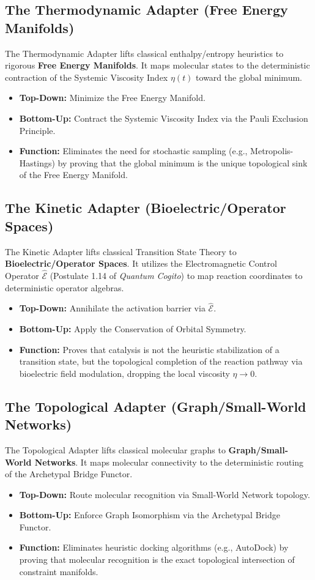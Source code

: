 \documentclass[11pt,openany]{extbook}
\theoremstyle{plain}
\theoremstyle{definition}
\begin{document}
\subsection{The Thermodynamic Adapter (Free Energy Manifolds)}
The Thermodynamic Adapter lifts classical enthalpy/entropy heuristics to rigorous \textbf{Free Energy Manifolds}. It maps molecular states to the deterministic contraction of the Systemic Viscosity Index $\eta(t)$ toward the global minimum.
\begin{itemize}
    \item \textbf{Top-Down:} Minimize the Free Energy Manifold.
    \item \textbf{Bottom-Up:} Contract the Systemic Viscosity Index via the Pauli Exclusion Principle.
    \item \textbf{Function:} Eliminates the need for stochastic sampling (e.g., Metropolis-Hastings) by proving that the global minimum is the unique topological sink of the Free Energy Manifold.
\end{itemize}

\subsection{The Kinetic Adapter (Bioelectric/Operator Spaces)}
The Kinetic Adapter lifts classical Transition State Theory to \textbf{Bioelectric/Operator Spaces}. It utilizes the Electromagnetic Control Operator $\hat{\mathcal{E}}$ (Postulate 1.14 of \textit{Quantum Cogito}) to map reaction coordinates to deterministic operator algebras.
\begin{itemize}
    \item \textbf{Top-Down:} Annihilate the activation barrier via $\hat{\mathcal{E}}$.
    \item \textbf{Bottom-Up:} Apply the Conservation of Orbital Symmetry.
    \item \textbf{Function:} Proves that catalysis is not the heuristic stabilization of a transition state, but the topological completion of the reaction pathway via bioelectric field modulation, dropping the local viscosity $\eta \to 0$.
\end{itemize}

\subsection{The Topological Adapter (Graph/Small-World Networks)}
The Topological Adapter lifts classical molecular graphs to \textbf{Graph/Small-World Networks}. It maps molecular connectivity to the deterministic routing of the Archetypal Bridge Functor.
\begin{itemize}
    \item \textbf{Top-Down:} Route molecular recognition via Small-World Network topology.
    \item \textbf{Bottom-Up:} Enforce Graph Isomorphism via the Archetypal Bridge Functor.
    \item \textbf{Function:} Eliminates heuristic docking algorithms (e.g., AutoDock) by proving that molecular recognition is the exact topological intersection of constraint manifolds.
\end{itemize}
\end{document}
